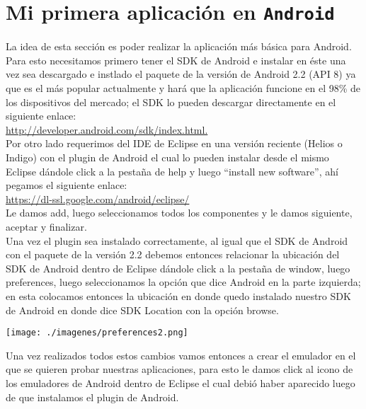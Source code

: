 \documentclass[letterpaper,12pt]{book}
\begin{document}
\begin{mainmatter}
\begin{itemize}
\end{itemize}

\appendix

\chapter{Mi primera aplicación en \texttt{Android}}

La idea de esta sección es poder realizar la aplicación más básica para Android.
Para esto necesitamos primero tener el SDK de Android e instalar en éste una vez
sea descargado e instlado el paquete de la versión de Android 2.2 (API 8) ya que 
es el más popular actualmente y hará que la aplicación funcione en el 98\% 
de los dispositivos del mercado; el SDK lo pueden descargar directamente en el 
siguiente enlace:\\
\url{http://developer.android.com/sdk/index.html.}\\ 

Por otro lado requerimos del IDE de Eclipse en una versión reciente (Helios o Indigo)
con el plugin de Android el cual lo pueden instalar desde el mismo Eclipse dándole 
click a la pestaña de help y luego ``install new software'', ahí pegamos el siguiente enlace:\\
\url{https://dl-ssl.google.com/android/eclipse/}\\

Le damos add, luego seleccionamos todos los componentes y le damos siguiente, aceptar y finalizar.\\

Una vez el plugin sea instalado correctamente, al igual que el SDK de Android 
con el paquete de la versión 2.2 debemos entonces relacionar la ubicación del 
SDK de Android dentro de Eclipse dándole click a la pestaña de window, luego 
preferences, luego seleccionamos la opción que dice Android en la parte izquierda; 
en esta colocamos entonces la ubicación en donde quedo instalado nuestro SDK de 
Android en donde dice SDK Location con la opción browse.\\

\begin{center}
 \texttt{[image: ./imagenes/preferences2.png]}

\end{center}

Una vez realizados todos estos cambios vamos entonces a crear el emulador en 
el que se quieren probar nuestras aplicaciones, para esto le damos click al 
icono de los emuladores de Android dentro de Eclipse el cual debió haber 
aparecido luego de que instalamos el plugin de Android.\\


\end{mainmatter}
\end{document}
